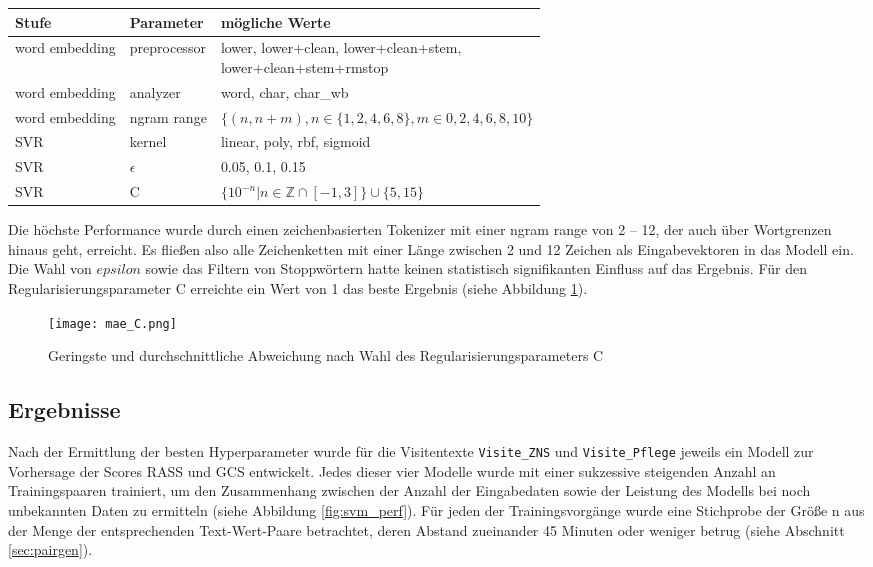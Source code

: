 \begin{table}[htb]
    \begin{tabular}{|l|l|l|}
    \hline
    Stufe          & Parameter    & mögliche Werte                                                \\ \hline
    word embedding & preprocessor & \makecell{lower, lower+clean, lower+clean+stem, \\ lower+clean+stem+rmstop} \\ \hline
    word embedding & analyzer     & word, char, char\_wb                                          \\ \hline
    word embedding & ngram range  & $\{(n, n+m), n \in \{1, 2, 4, 6, 8\}, m \in {0, 2, 4, 6, 8, 10}\}$                            \\ \hline
    SVR            & kernel       & linear, poly, rbf, sigmoid                                    \\ \hline
    SVR            & $\epsilon$      & 0.05, 0.1, 0.15                                               \\ \hline
    SVR            & C            & $\{10^{-n} | n \in \mathbb{Z} \cap [-1, 3] \} \cup \{5, 15\}$            \\ \hline
    \end{tabular}%
\end{table}

Die höchste Performance wurde durch einen zeichenbasierten Tokenizer mit einer ngram range von 2 -- 12, der auch über Wortgrenzen hinaus geht, erreicht. Es fließen also alle Zeichenketten mit einer Länge zwischen 2 und 12 Zeichen als Eingabevektoren in das Modell ein. Die Wahl von $epsilon$ sowie das Filtern von Stoppwörtern hatte keinen statistisch signifikanten Einfluss auf das Ergebnis. Für den Regularisierungsparameter C erreichte ein Wert von 1 das beste Ergebnis (siehe Abbildung \ref{fig:mae_c}).

\begin{figure}[htb]
    \captionsetup{justification=centering}
    \centering
    \texttt{[image: mae\_C.png]}
    \caption{Geringste und durchschnittliche Abweichung nach Wahl des Regularisierungsparameters C}
    \label{fig:mae_c}
\end{figure}

\subsection{Ergebnisse}
Nach der Ermittlung der besten Hyperparameter wurde für die Visitentexte \texttt{Visite\_ZNS} und \texttt{Visite\_Pflege} jeweils ein Modell zur Vorhersage der Scores RASS und GCS entwickelt. Jedes dieser vier Modelle wurde mit einer sukzessive steigenden Anzahl an Trainingspaaren trainiert, um den Zusammenhang zwischen der Anzahl der Eingabedaten sowie der Leistung des Modells bei noch unbekannten Daten zu ermitteln (siehe Abbildung \ref{fig:svm_perf}). Für jeden der Trainingsvorgänge wurde eine Stichprobe der Größe n aus der Menge der entsprechenden Text-Wert-Paare betrachtet, deren Abstand zueinander 45 Minuten oder weniger betrug (siehe Abschnitt \ref{sec:pairgen}). 

